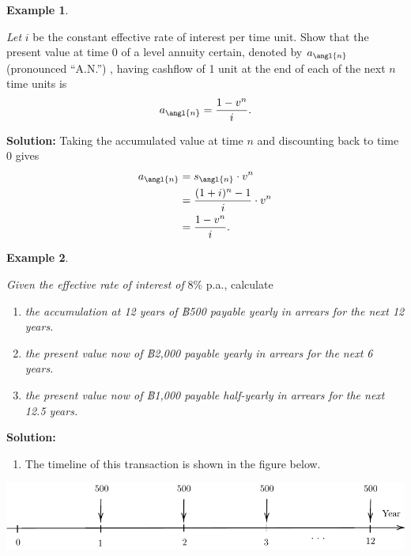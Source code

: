 \documentclass[landscape, 20pt]{extreport}
\providecommand{\tightlist}{%
  \setlength{\itemsep}{0pt}\setlength{\parskip}{0pt}}
\theoremstyle{definition}
\theoremstyle{definition}
\newtheorem{example}{Example}[chapter]
\theoremstyle{definition}
\theoremstyle{definition}
\theoremstyle{remark}
\begin{document}
\newpage \begin{example}
\protect\hypertarget{exm:unlabeled-div-26}{}\label{exm:unlabeled-div-26}

\emph{Let} \(i\) be the constant effective rate of interest per time unit. Show
that the present value at time 0 of a level annuity certain, denoted by
\(a_\angl{n}\) (pronounced ``A.N.'') , having cashflow of 1 unit at the end
of each of the next \(n\) time units is
\[a_\angl{n} = \frac{1 - v^n }{i}.\]

\end{example}

\textbf{Solution:} Taking the accumulated value at time \(n\) and discounting
back to time 0 gives \[\begin{aligned}
    a_\angl{n} &= s_\angl{n} \cdot v^n \\
            &= \frac{(1+i)^{n} - 1}{i} \cdot v^n \\
            &=  \frac{1 - v^n }{i}.\end{aligned}\]

\newpage \begin{example}
\protect\hypertarget{exm:unlabeled-div-27}{}\label{exm:unlabeled-div-27}

\emph{Given the effective rate of interest of} \(8\%\) p.a., calculate

\begin{enumerate}
\def\labelenumi{\arabic{enumi}.}
\item
  \emph{the accumulation at 12 years of ฿500 payable yearly in arrears for
  the next 12 years.}
\item
  \emph{the present value now of ฿2,000 payable yearly in arrears for the
  next 6 years.}
\item
  \emph{the present value now of ฿1,000 payable half-yearly in arrears for
  the next 12.5 years.}
\end{enumerate}

\end{example}

\textbf{Solution:}

\begin{enumerate}
\def\labelenumi{\arabic{enumi}.}
\tightlist
\item
  The timeline of this transaction is shown in the figure below.
\end{enumerate}

\begin{center}\includegraphics{tikz-ex10-1} \end{center}
\end{document}
